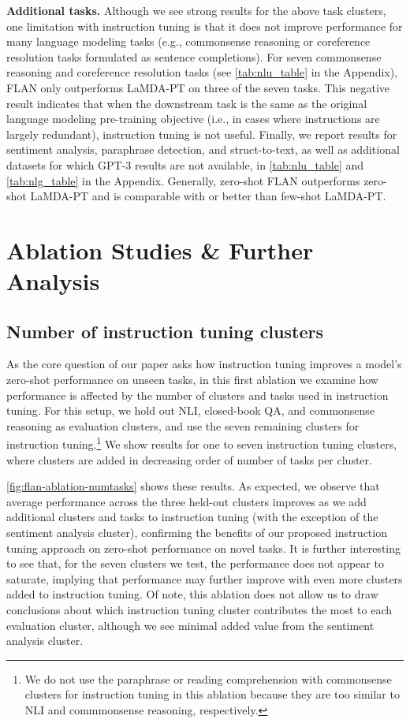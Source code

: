\documentclass{article} \usepackage{iclr2022_conference,times}
\newcommand{\flan}{FLAN}
\newcommand{\baselm}{LaMDA-PT}
\begin{document}
 








\textbf{Additional tasks.}
Although we see strong results for the above task clusters, one limitation with instruction tuning is that it does not improve performance for many language modeling tasks (e.g., commonsense reasoning or coreference resolution tasks formulated as sentence completions).
For seven commonsense reasoning and coreference resolution tasks (see \cref{tab:nlu_table} in the Appendix), \flan{} only outperforms \baselm{} on three of the seven tasks.
This negative result indicates that when the downstream task is the same as the original language modeling pre-training objective (i.e., in cases where instructions are largely redundant), instruction tuning is not useful.
Finally, we report results for sentiment analysis, paraphrase detection, and struct-to-text, as well as additional datasets for which GPT-3 results are not available, in \cref{tab:nlu_table} and \cref{tab:nlg_table} in the Appendix.
Generally, zero-shot \flan{} outperforms zero-shot \baselm{} and is comparable with or better than few-shot \baselm{}.

\section{Ablation Studies \& Further Analysis}

\subsection{Number of instruction tuning clusters}\label{subsec:finetuning_clusters}
As the core question of our paper asks how instruction tuning improves a model's zero-shot performance on unseen tasks, in this first ablation we examine how performance is affected by the number of clusters and tasks used in instruction tuning.
For this setup, we hold out NLI, closed-book QA, and commonsense reasoning as evaluation clusters, and use the seven remaining clusters for instruction tuning.\footnote{We do not use the paraphrase or reading comprehension with commonsense clusters for instruction tuning in this ablation because they are too similar to NLI and commmonsense reasoning, respectively.}
We show results for one to seven instruction tuning clusters, where clusters are added in decreasing order of number of tasks per cluster.

\cref{fig:flan-ablation-numtasks} shows these results.
As expected, we observe that average performance across the three held-out clusters improves as we add additional clusters and tasks to instruction tuning (with the exception of the sentiment analysis cluster), confirming the benefits of our proposed instruction tuning approach on zero-shot performance on novel tasks.
It is further interesting to see that, for the seven clusters we test, the performance does not appear to saturate, implying that performance may further improve with even more clusters added to instruction tuning.
Of note, this ablation does not allow us to draw conclusions about which instruction tuning cluster contributes the most to each evaluation cluster, although we see minimal added value from the sentiment analysis cluster.
\end{document}
